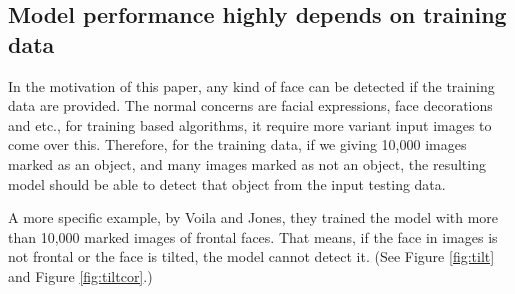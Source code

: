 \documentclass[10pt,twocolumn,letterpaper]{article}
\begin{document}
\subsection{Model performance highly depends on training data}
In the motivation of this paper, any kind of face can be detected if the training data are provided.
The normal concerns are facial expressions, face decorations and etc., for training based algorithms, it require more variant input images to come over this.
Therefore, for the training data, if we giving 10,000 images marked as an object, and many images marked as not an object,
the resulting model should be able to detect that object from the input testing data.

A more specific example, by Voila and Jones, they trained the model with more than 10,000 marked images of frontal faces.
That means, if the face in images is not frontal or the face is tilted, the model cannot detect it. (See Figure \ref{fig:tilt} and Figure \ref{fig:tiltcor}.)
\end{document}
